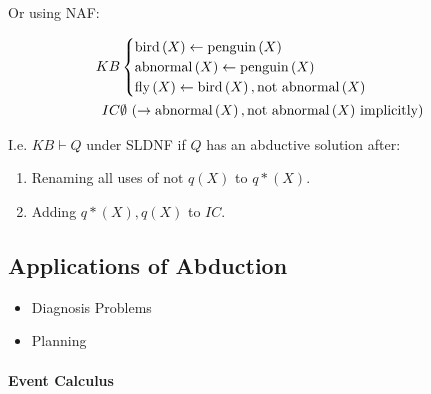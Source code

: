 \documentclass[twocolumn,english]{article}
\begin{document}
Or using NAF:

\begin{align*}
KB & \begin{cases}
\text{bird}\left(X\right)\leftarrow\text{penguin}\left(X\right)\\
\text{abnormal}\left(X\right)\leftarrow\text{penguin}\left(X\right)\\
\text{fly}\left(X\right)\leftarrow\text{bird}\left(X\right),\text{not abnormal}\left(X\right)
\end{cases}\\
IC & \emptyset\text{ (\ensuremath{\rightarrow\text{abnormal}\left(X\right),\text{not abnormal}\left(X\right)} implicitly)}
\end{align*}

I.e. $KB\vdash Q$ under SLDNF if $Q$ has an abductive solution after: 
\begin{enumerate}
\item Renaming all uses of $\text{not }q\left(X\right)$ to $q*\left(X\right)$. 
\item Adding $q*\left(X\right),q\left(X\right)$ to $IC$. 
\end{enumerate}

\subsection{Applications of Abduction}
\begin{itemize}
\item Diagnosis Problems 
\item Planning 
\end{itemize}

\paragraph{Event Calculus}
\end{document}
